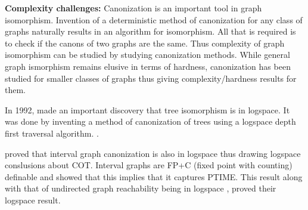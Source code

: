 \documentclass[MS,]{iitmdiss}
\begin{document}
{\bf Complexity challenges:} Canonization is an important tool in graph isomorphism. Invention of a
deterministic method of canonization for any class of graphs naturally
results in an algorithm for isomorphism. All that is required is to
check if the canons of two graphs are the same. Thus complexity of
graph isomorphism can be studied by studying canonization
methods. While general graph ismorphism remains elusive in terms of
hardness, canonization has been studied for smaller classes of graphs
thus giving complexity/hardness results for them.

In 1992, \cite{sl92} made an important discovery that tree isomorphism
is in logspace. It was done by inventing a method of canonization of
trees using a logspace depth first traversal
algorithm. .

\cite{kklv10} proved that interval graph canonization is also in
logspace thus drawing logspace conslusions about COT. 
Interval graphs are FP+C (fixed point with
counting) definable  and \cite{l10} showed that
this implies that it captures PTIME.  This result
along with that of undirected graph reachability being in logspace
\cite{rei08}, \cite{kklv10} proved their logspace result.\\ 






\end{document}
